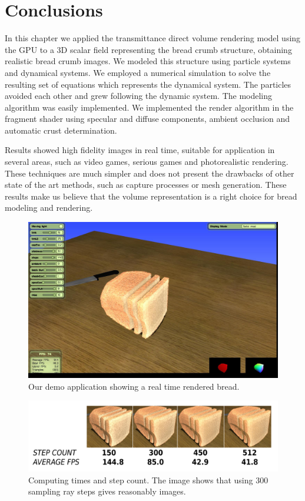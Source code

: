 \section{Conclusions}

In this chapter we applied the transmittance direct volume rendering model using the GPU to a 3D scalar field representing the bread crumb structure, obtaining realistic bread crumb images.
We modeled this structure using particle systems and dynamical systems.
We employed a numerical simulation to solve the resulting set of equations which represents the dynamical system. 
The particles avoided each other and grew following the dynamic system.
The modeling algorithm was easily implemented. 
We implemented the render algorithm in the fragment shader using specular and diffuse components, ambient occlusion and automatic crust determination.

Results showed high fidelity images in real time, suitable for application in several areas, such as video games, serious games \cite{Susi2007} and photorealistic rendering. 
These techniques are much simpler and does not present the drawbacks of other state of the art methods, such as capture processes or mesh generation.
These results make us believe that the volume representation is a right choice for bread modeling and rendering.


\begin{figure}
  \centerline{\includegraphics[width=13cm]{figures/application}}
  \caption{Our demo application showing a real time rendered bread.}
  \label{fg:application}
\end{figure}

\begin{figure}
  \centerline{\includegraphics[width=13cm]{figures/stepcount}}
  \caption{Computing times and step count. The image shows that using $300$ sampling ray steps gives reasonably images. }
  \label{fg:stepcount}
\end{figure}

